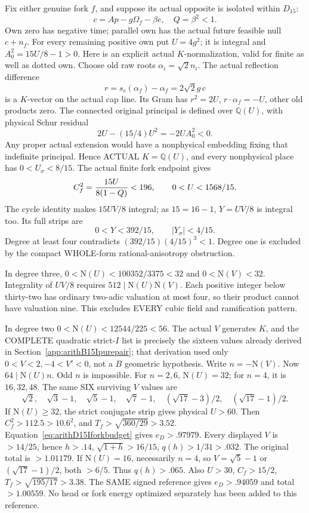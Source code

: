 \documentclass[11pt]{article}
\begin{document}
Fix either genuine fork \(f\), and suppose its actual
opposite is isolated within \(D_{15}\):
\[
                  c=Ap-g\Omega_f-\beta e,\quad Q=\beta^2<1.
\]
Own zero has negative time; parallel own has
the actual future feasible null \(c+n_f\).
For every remaining positive own put \(U=4g^2\);
it is integral and
\(A_0^2=15U/8-1>0\).
Here is an explicit actual \(K\)-normalization,
valid for finite as well as dotted own.
Choose old raw roots \(\alpha_i=\sqrt2n_i\).
The actual reflection difference
\[
                       r=s_c(\alpha_f)-\alpha_f=2\sqrt2g\,c
\]
is a \(K\)-vector on the actual cap line.
Its Gram has
\(r^2=2U\), \(r\cdot\alpha_f=-U\), other old products zero.
The connected original principal is defined over
\(\mathbb Q(U)\), with physical Schur residual
\[
                     2U-(15/4)U^2=-2UA_0^2<0.
\]
Any proper actual extension would have a nonphysical
embedding fixing that indefinite principal.
Hence ACTUAL \(K=\mathbb Q(U)\), and every nonphysical
place has \(0<U_\sigma<8/15\).
The actual finite fork endpoint gives
\[
              C_f^2={15U\over8(1-Q)}<196,\qquad
              0<U<1568/15 .
\]
The cycle identity makes \(15UV/8\) integral;
as \(15=16-1\), \(Y=UV/8\) is integral too.
Its full strips are
\[
                 0<Y<392/15,\qquad |Y_\sigma|<4/15.
\]
Degree at least four contradicts
\((392/15)(4/15)^3<1\).
Degree one is excluded by the compact WHOLE-form
rational-anisotropy obstruction.

In degree three,
\(0<\mathrm N(U)<100352/3375<32\) and
\(0<\mathrm N(V)<32\).
Integrality of \(UV/8\) requires
\(512\mid\mathrm N(U)\mathrm N(V)\).
Each positive integer below thirty-two has ordinary
two-adic valuation at most four, so their product
cannot have valuation nine.
This excludes EVERY cubic field and ramification pattern.

In degree two \(0<\mathrm N(U)<12544/225<56\).
The actual \(V\) generates \(K\), and the COMPLETE
quadratic strict-\(I\) list is precisely the sixteen
values already derived in
Section~\ref{app:arithB15Ipurepair};
that derivation used only \(0<V<2,-4<V'<0\),
not a \(B\) geometric hypothesis.
Write \(n=-\mathrm N(V)\).
Now \(64\mid\mathrm N(U)n\).
Odd \(n\) is impossible.
For \(n=2,6\), \(\mathrm N(U)=32\);
for \(n=4\), it is \(16,32,48\).
The same SIX surviving \(V\) values are
\[
 \sqrt2,\quad\sqrt3-1,\quad\sqrt5-1,\quad\sqrt7-1,\quad
 (\sqrt{17}-3)/2,\quad(\sqrt{17}-1)/2.
\]
If \(\mathrm N(U)\ge32\), the strict conjugate strip
gives physical \(U>60\).
Then \(C_f^2>112.5>10.6^2\), and
\(T_f>\sqrt{360/29}>3.52\).
Equation~\eqref{eq:arithD15Iforkbudget} gives
\(e_D>.97979\).
Every displayed \(V\) is \(>14/25\), hence \(h>.14\),
\(\sqrt{1+h}>16/15\), \(q(h)>1/31>.032\).
The original total is \(>1.01179\).
If \(\mathrm N(U)=16\), necessarily \(n=4\),
so \(V=\sqrt5-1\) or \((\sqrt{17}-1)/2\),
both \(>6/5\).
Thus \(q(h)>.065\).
Also \(U>30\), \(C_f>15/2\),
\(T_f>\sqrt{195/17}>3.38\).
The SAME signed reference gives \(e_D>.94059\)
and total \(>1.00559\).
No head or fork energy optimized separately has
been added to this reference.
\end{document}
